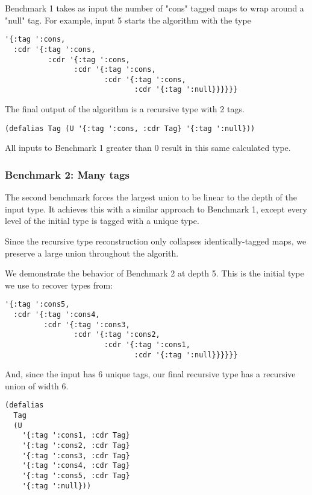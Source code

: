 Benchmark 1 takes as input the number of "cons" tagged maps to wrap
around a "null" tag. For example, input 5 starts the algorithm with
the type

\begin{verbatim}
'{:tag ':cons,
  :cdr '{:tag ':cons,
          :cdr '{:tag ':cons,
                :cdr '{:tag ':cons, 
                       :cdr '{:tag ':cons, 
                              :cdr '{:tag ':null}}}}}}
\end{verbatim}

The final output of the algorithm is a recursive type with 2 tags.

\begin{verbatim}
(defalias Tag (U '{:tag ':cons, :cdr Tag} '{:tag ':null}))
\end{verbatim}

All inputs to Benchmark 1 greater than 0 result in this same calculated type.

\subsubsection{Benchmark 2: Many tags}

The second benchmark forces the largest union to be linear to the depth
of the input type. It achieves this with a similar approach to Benchmark 1,
except every level of the initial type is tagged with a unique type.

Since the recursive type reconstruction only collapses identically-tagged
maps, we preserve a large union throughout the algorith.

We demonstrate the behavior of Benchmark 2 at depth 5. This is the initial
type we use to recover types from:

\begin{verbatim}
'{:tag ':cons5,
  :cdr '{:tag ':cons4,
         :cdr '{:tag ':cons3,
                :cdr '{:tag ':cons2, 
                       :cdr '{:tag ':cons1,
                              :cdr '{:tag ':null}}}}}}
\end{verbatim}

And, since the input has 6 unique tags, our final recursive type has a
recursive union of width 6.

\begin{verbatim}
(defalias
  Tag
  (U
    '{:tag ':cons1, :cdr Tag}
    '{:tag ':cons2, :cdr Tag}
    '{:tag ':cons3, :cdr Tag}
    '{:tag ':cons4, :cdr Tag}
    '{:tag ':cons5, :cdr Tag}
    '{:tag ':null}))
\end{verbatim}

